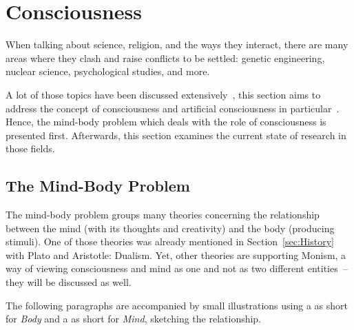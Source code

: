 \section{Consciousness}
\label{sec:Consciousness}

When talking about science, religion, and the ways they interact, there are many areas where they clash and raise conflicts to be settled: genetic engineering, nuclear science, psychological studies, and more.

A lot of those topics have been discussed extensively~\cite{barbour1993ethics,pfleiderer2010genethics,chernus1991nuclear}, this section aims to address the concept of consciousness and artificial consciousness in particular~\cite{buttazzo2001artificial,chella2013artificial}.
Hence, the mind-body problem which deals with the role of consciousness is presented first.
Afterwards, this section examines the current state of research in those fields. %

\def\lmibop#1{\texttt{[image: figures/asq\_mibop\_\#1-compressed.pdf]}}

\newcommand*\moppreview[2]{\needspace{3\baselineskip}\paragraph[#2]{\smash{\raisebox{-2.3\baselineskip}{\lmibop{#1}}} #2}%
\parshape=4
0cm \linewidth
1.65cm \dimexpr\linewidth-1.65cm\relax
1.5cm \dimexpr\linewidth-1.5cm\relax
0cm \linewidth}

\subsection{The Mind-Body Problem}
\label{subsec:mind-body}The mind-body problem groups many theories concerning the relationship between the mind (with its thoughts and creativity) and the body (producing stimuli).
One of those theories was already mentioned in Section~\ref{sec:History} with Plato and Aristotle: Dualism.
Yet, other theories are supporting Monism, a way of viewing consciousness and mind as one and not as two different entities~-- they will be discussed as well.

The following paragraphs are accompanied by small illustrations using a  as short for \emph{Body} and a  as short for \emph{Mind}, sketching the relationship.


